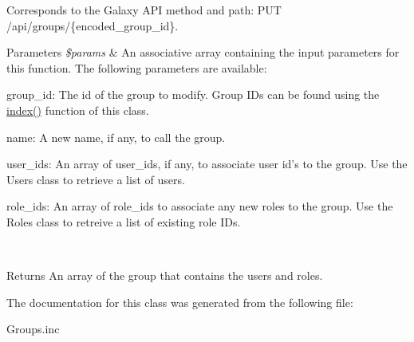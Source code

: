 Corresponds to the Galaxy A\-P\-I method and path\-: P\-U\-T /api/groups/\{encoded\-\_\-group\-\_\-id\}.


\begin{DoxyParams}{Parameters}
{\em \$params} & An associative array containing the input parameters for this function. The following parameters are available\-:
\begin{DoxyItemize}
\item group\-\_\-id\-: The id of the group to modify. Group I\-Ds can be found using the \hyperlink{classGalaxyGroups_a8f399f6bd46cf8ad7817cdd3d450e839}{index()} function of this class.
\item name\-: A new name, if any, to call the group.
\item user\-\_\-ids\-: An array of user\-\_\-ids, if any, to associate user id's to the group. Use the Users class to retrieve a list of users.
\item role\-\_\-ids\-: An array of role\-\_\-ids to associate any new roles to the group. Use the Roles class to retreive a list of existing role I\-Ds.
\end{DoxyItemize}\\
\hline
\end{DoxyParams}
\begin{DoxyReturn}{Returns}
An array of the group that contains the users and roles. 
\end{DoxyReturn}


The documentation for this class was generated from the following file\-:\begin{DoxyCompactItemize}
\item 
Groups.\-inc\end{DoxyCompactItemize}
